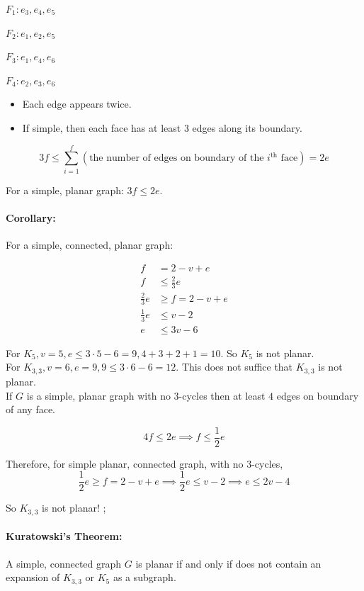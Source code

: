 \documentclass[a4paper, 11pt, twoside]{article}
\begin{document}
$F_1:e_3, e_4, e_5$

$F_2:e_1, e_2, e_5$

$F_3:e_1, e_4, e_6$

$F_4:e_2, e_3, e_6$

\begin{itemize}
	\item Each edge appears twice.
	\item If simple, then each face has at least $3$ edges along its boundary.
\end{itemize}

\[3f\leq\sum^f_{i=1}\left(\text{the number of edges on boundary of the $i^{\text{th}}$ face}\right)= 2e\]

For a simple, planar graph: $3f\leq 2e$.

\paragraph{Corollary:} For a simple, connected, planar graph:

\[\begin{split}
	f&=2-v+e\\
	f&\leq \frac{2}{3}e\\
	\frac{2}{3}e&\geq f=2-v+e\\
	\frac{1}{3}e&\leq v-2\\
	e&\leq 3v-6
\end{split}
\]

For $K_5, v=5, e\leq 3\cdot 5-6=9, 4+3+2+1=10$. So $K_5$ is not planar.\\

For $K_{3,3}, v=6, e=9, 9\leq 3\cdot 6 - 6=12$. This does not suffice that $K_{3,3}$ is not planar.\\

If $G$ is a simple, planar graph with no 3-cycles then at least $4$ edges on boundary of any face.

\[4f\leq 2e\implies f\leq \frac12e\]

Therefore, for simple planar, connected graph, with no 3-cycles, \[\frac12e\geq f=2-v+e\implies\frac12e\leq v-2\implies e\leq 2v-4\]

So $K_{3,3}$ is not planar!
;
\paragraph{Kuratowski's Theorem:} A simple, connected graph $G$ is planar if and only if does not contain an expansion of $K_{3,3}$ or $K_5$ as a subgraph.
\end{document}
